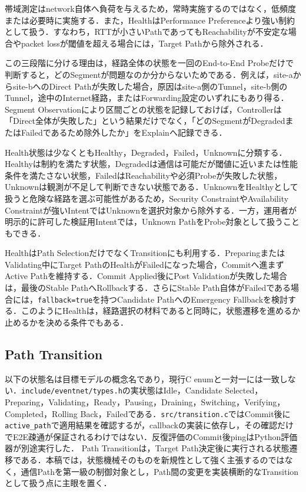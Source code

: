 \documentclass[11pt,a4paper,twoside]{ltjsarticle}
\begin{document}
帯域測定はnetwork自体へ負荷を与えるため，常時実施するのではなく，低頻度または必要時に実施する．また，HealthはPerformance Preferenceより強い制約として扱う．すなわち，RTTが小さいPathであってもReachabilityが不安定な場合やpacket lossが閾値を超える場合には，Target Pathから除外される．

この三段階に分ける理由は，経路全体の状態を一回のEnd-to-End Probeだけで判断すると，どのSegmentが問題なのか分からないためである．例えば，site-aからsite-bへのDirect Pathが失敗した場合，原因はsite-a側のTunnel，site-b側のTunnel，途中のInternet経路，またはForwarding設定のいずれにもあり得る．Segment Observationにより区間ごとの状態を記録しておけば，Controllerは「Direct全体が失敗した」という結果だけでなく，「どのSegmentがDegradedまたはFailedであるため除外したか」をExplainへ記録できる．

Health状態は少なくともHealthy，Degraded，Failed，Unknownに分類する．Healthyは制約を満たす状態，Degradedは通信は可能だが閾値に近いまたは性能条件を満たさない状態，FailedはReachabilityや必須Probeが失敗した状態，Unknownは観測が不足して判断できない状態である．UnknownをHealthyとして扱うと危険な経路を選ぶ可能性があるため，Security ConstraintやAvailability Constraintが強いIntentではUnknownを選択対象から除外する．一方，運用者が明示的に許可した検証用Intentでは，Unknown PathをProbe対象として扱うこともできる．

HealthはPath SelectionだけでなくTransitionにも利用する．PreparingまたはValidating中にTarget PathのHealthがFailedになった場合，Commitへ進まずActive Pathを維持する．Commit Applied後にPost Validationが失敗した場合は，最後のStable PathへRollbackする．さらにStable Path自体がFailedである場合には，\texttt{fallback=true}を持つCandidate PathへのEmergency Fallbackを検討する．このようにHealthは，経路選択の材料であると同時に，状態遷移を進めるか止めるかを決める条件でもある．

\subsection{Path Transition}
以下の状態名は目標モデルの概念名であり，現行C enumと一対一には一致しない．\texttt{include/eventnet/types.h}の実状態はIdle，Candidate Selected，Preparing，Validating，Ready，Pausing，Draining，Switching，Verifying，Completed，Rolling Back，Failedである．\texttt{src/transition.c}ではCommit後に\texttt{active\_path}で適用結果を確認するが，callbackの実装に依存し，その確認だけでE2E疎通が保証されるわけではない．反復評価のCommit後pingはPython評価器が別途実行した．
Path Transitionは，Target Path決定後に実行される状態遷移である．本稿では，状態機械そのものを新規性として強く主張するのではなく，通信Pathを第一級の制御対象とし，Path間の変更を実装横断的なTransitionとして扱う点に主眼を置く．
\end{document}
